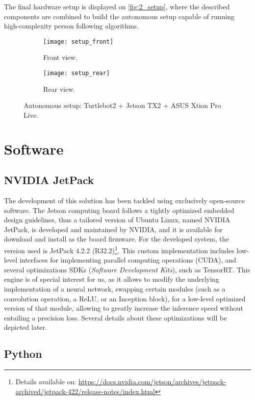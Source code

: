 The final hardware setup is displayed on \autoref{fig:2_setup}, where the described components are combined to build the autonomous setup capable of running high-complexity person following algorithms.\\

\begin{figure}[h]
	\centering
	\begin{subfigure}[h]{0.45\linewidth}
		\centering
		\texttt{[image: setup\_front]}
		\caption{Front view.}
	\end{subfigure}
	\begin{subfigure}[h]{0.45\linewidth}
		\centering
		\texttt{[image: setup\_rear]}
		\caption{Rear view.}
	\end{subfigure}
	\caption{Autonomous setup: Turtlebot2 + Jetson TX2 + ASUS Xtion Pro Live.}
	\label{fig:2_setup}
\end{figure}


\section{Software}
\subsection{NVIDIA JetPack}
The development of this solution has been tackled using exclusively open-source software. The Jetson computing board follows a tightly optimized embedded design guidelines, thus a tailored version of Ubuntu Linux, named NVIDIA JetPack, is developed and maintained by NVIDIA, and it is available for download and install as the board firmware. For the developed system, the version used is JetPack 4.2.2 (R32.2)\footnote{Details available on: \url{https://docs.nvidia.com/jetson/archives/jetpack-archived/jetpack-422/release-notes/index.html}}. This custom implementation includes low-level interfaces for implementing parallel computing operations (CUDA), and several optimizations SDKs (\textit{Software Development Kits}), such as TensorRT. This engine is of special interest for us, as it allows to modify the underlying implementation of a neural network, swapping certain modules (such as a convolution operation, a ReLU, or an Inception block), for a low-level optimized version of that module, allowing to greatly increase the inference speed without entailing a precision loss. Several details about these optimizations will be depicted later.\\

\subsection{Python}

